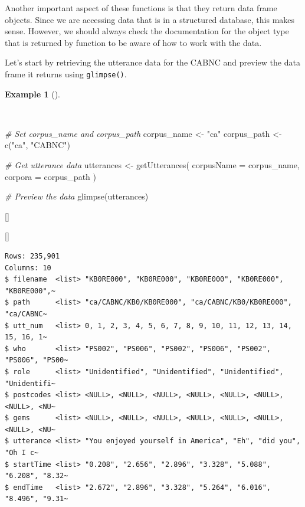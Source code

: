 \documentclass[
  letterpaper,
  krantz1]{latex/krantz-mod}
\newenvironment{Shaded}{\begin{snugshade}}{\end{snugshade}}
\newcommand{\AttributeTok}[1]{\textcolor[rgb]{0.00,0.00,0.00}{#1}}
\newcommand{\CommentTok}[1]{\textcolor[rgb]{0.00,0.00,0.00}{\textit{#1}}}
\newcommand{\FunctionTok}[1]{\textcolor[rgb]{0.00,0.00,0.00}{#1}}
\newcommand{\NormalTok}[1]{\textcolor[rgb]{0.00,0.00,0.00}{#1}}
\newcommand{\OtherTok}[1]{\textcolor[rgb]{0.00,0.00,0.00}{#1}}
\newcommand{\StringTok}[1]{\textcolor[rgb]{0.00,0.00,0.00}{#1}}
\newcommand{\cindex}[1]{%
  \StrSubstitute{#1}{_}{\_}[\temp]%
  \index{\temp}%
}
\theoremstyle{definition}
\theoremstyle{definition}
\newtheorem{example}{Example}[chapter]
\theoremstyle{remark}
\begin{document}
Another important aspect of these functions is that they return data
frame objects. Since we are accessing data that is in a structured
database, this makes sense. However, we should always check the
documentation for the object type that is returned by function to be
aware of how to work with the data.

Let's start by retrieving the utterance data for the CABNC and preview
the data frame it returns using \texttt{glimpse()}.

\begin{example}[]\protect\hypertarget{exm-acquire-get-utterances}{}\label{exm-acquire-get-utterances}

~

\begin{Shaded}
\begin{Highlighting}[numbers=left,,]
\CommentTok{\# Set corpus\_name and corpus\_path}
\NormalTok{corpus\_name }\OtherTok{\textless{}{-}} \StringTok{"ca"}
\NormalTok{corpus\_path }\OtherTok{\textless{}{-}} \FunctionTok{c}\NormalTok{(}\StringTok{"ca"}\NormalTok{, }\StringTok{"CABNC"}\NormalTok{)}

\CommentTok{\# Get utterance data}
\NormalTok{utterances }\OtherTok{\textless{}{-}}
  \FunctionTok{getUtterances}\NormalTok{(}
    \AttributeTok{corpusName =}\NormalTok{ corpus\_name,}
    \AttributeTok{corpora =}\NormalTok{ corpus\_path}
\NormalTok{    )}

\CommentTok{\# Preview the data}
\FunctionTok{glimpse}\NormalTok{(utterances)}
\end{Highlighting}
\end{Shaded}

\cindex{getUtterances()}
\cindex{glimpse()}

\begin{verbatim}
Rows: 235,901
Columns: 10
$ filename  <list> "KB0RE000", "KB0RE000", "KB0RE000", "KB0RE000", "KB0RE000",~
$ path      <list> "ca/CABNC/KB0/KB0RE000", "ca/CABNC/KB0/KB0RE000", "ca/CABNC~
$ utt_num   <list> 0, 1, 2, 3, 4, 5, 6, 7, 8, 9, 10, 11, 12, 13, 14, 15, 16, 1~
$ who       <list> "PS002", "PS006", "PS002", "PS006", "PS002", "PS006", "PS00~
$ role      <list> "Unidentified", "Unidentified", "Unidentified", "Unidentifi~
$ postcodes <list> <NULL>, <NULL>, <NULL>, <NULL>, <NULL>, <NULL>, <NULL>, <NU~
$ gems      <list> <NULL>, <NULL>, <NULL>, <NULL>, <NULL>, <NULL>, <NULL>, <NU~
$ utterance <list> "You enjoyed yourself in America", "Eh", "did you", "Oh I c~
$ startTime <list> "0.208", "2.656", "2.896", "3.328", "5.088", "6.208", "8.32~
$ endTime   <list> "2.672", "2.896", "3.328", "5.264", "6.016", "8.496", "9.31~
\end{verbatim}

\end{example}
\end{document}
